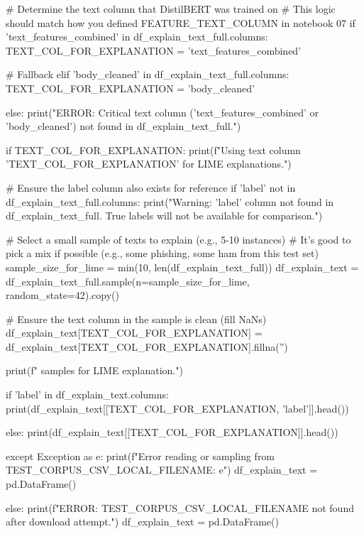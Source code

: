 \begin{ffcode}
            # Determine the text column that DistilBERT was trained on
            # This logic should match how you defined FEATURE_TEXT_COLUMN in notebook 07
            if 'text_features_combined' in df_explain_text_full.columns:
                TEXT_COL_FOR_EXPLANATION = 'text_features_combined'

            # Fallback
            elif 'body_cleaned' in df_explain_text_full.columns:
                TEXT_COL_FOR_EXPLANATION = 'body_cleaned'

            else:
                print("ERROR: Critical text column ('text_features_combined' or 'body_cleaned') not found in df_explain_text_full.")

            if TEXT_COL_FOR_EXPLANATION:
                print(f"Using text column '{TEXT_COL_FOR_EXPLANATION}' for LIME explanations.")

                # Ensure the label column also exists for reference
                if 'label' not in df_explain_text_full.columns:
                    print("Warning: 'label' column not found in df_explain_text_full. True labels will not be available for comparison.")

                # Select a small sample of texts to explain (e.g., 5-10 instances)
                # It's good to pick a mix if possible (e.g., some phishing, some ham from this test set)
                sample_size_for_lime = min(10, len(df_explain_text_full))
                df_explain_text = df_explain_text_full.sample(n=sample_size_for_lime, random_state=42).copy()

                # Ensure the text column in the sample is clean (fill NaNs)
                df_explain_text[TEXT_COL_FOR_EXPLANATION] = df_explain_text[TEXT_COL_FOR_EXPLANATION].fillna('')

                print(f" samples for LIME explanation.")

                if 'label' in df_explain_text.columns:
                    print(df_explain_text[[TEXT_COL_FOR_EXPLANATION, 'label']].head())

                else:
                    print(df_explain_text[[TEXT_COL_FOR_EXPLANATION]].head())

        except Exception as e:
            print(f"Error reading or sampling from {TEST_CORPUS_CSV_LOCAL_FILENAME}: {e}")
            df_explain_text = pd.DataFrame()

    else:
        print(f"ERROR: {TEST_CORPUS_CSV_LOCAL_FILENAME} not found after download attempt.")
        df_explain_text = pd.DataFrame()


\end{ffcode}
